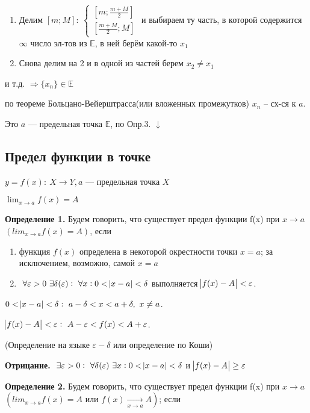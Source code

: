 \documentclass{article}
\begin{document}
  \begin{enumerate}
      \item Делим \([m; M]:\ \begin{cases}[m; \frac{m+M}{2}]\\ [\frac{m+M}{2}; M]\end{cases}\)
      и выбираем ту часть, в которой содержится \(\infty\) число эл-тов из \(\mathbb{E}\), в ней берём какой-то \(x_1\)
      \item Снова делим на 2 и в одной из частей берем \(x_2 \neq x_1\)
  \end{enumerate}
  и т.д. \(\Rightarrow \{x_n\} \in \mathbb{E}\)

  по теореме Больцано-Вейерштрасса(или вложенных промежутков) \(x_n\) -- сх-ся к \(a\).

  Это \(a\) --- предельная точка \(\mathbb{E}\), по Опр.3.
  \(\downarrow\)

  \subsection{Предел функции в точке}

  \(y=f(x):\ X \rightarrow Y, a\) --- предельная точка \(X\) 
  
  \(\lim_{x \rightarrow a}{f(x)} = A\)

  \textbf{Определение 1.} Будем говорить, что существует предел функции f(x) при \(x \rightarrow a\) \( (lim_{x\rightarrow a} f(x) = A) \), если

  \begin{enumerate}
      \item функция \(f(x)\) определена в некоторой окрестности точки \(x=a\); за исключением, возможно, самой \(x=a\)
      \item \(\ \forall \varepsilon > 0\ \exists \delta(\varepsilon):\ \forall x: 0 < \abs{x - a} < \delta\) выполняется \(\abs{f(x) - A} < \varepsilon\).
  \end{enumerate}
  \(0 < \abs{x - a} < \delta:\ a - \delta < x < a + \delta,\ x \neq a\).

  \(\abs{f(x) - A} < \varepsilon:\ A - \varepsilon < f(x) < A + \varepsilon\).

  (Определение на языке \(\varepsilon - \delta\) или определение по Коши)

  \textbf{Отрицание.} \(\ \exists \varepsilon > 0:\ \forall \delta(\varepsilon)\ \exists x: 0 < \abs{x - a} < \delta\) и \(\abs{f(x) - A} \geq \varepsilon\)

  \textbf{Определение 2.} Будем говорить, что существует предел функции f(x) при \(x \rightarrow a\) \( (lim_{x\rightarrow a} f(x) = A \textrm{ или } f(x) \xrightarrow[x \rightarrow a]{} A)\); если
\end{document}
